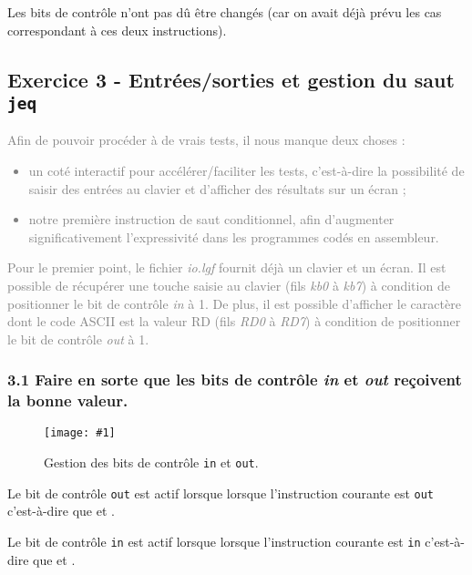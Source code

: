 \documentclass[twoside, 12pt, a4paper]{article}
\newcommand{\cf}[3]{
    \begin{figure}[!h]
        \centering
        \texttt{[image: \#1]}
    \caption{#3}\label{Fig:#1}
    \end{figure}
}
\newcommand{\hcf}[2]{\cf{#1}{.75}{#2}}
\newcommand{\fmnt}[2]{
\begin{figure}[!h]
    \centering
    \inputminted[]{asm}{#1}
    \caption{#2}
    \label{fig:#2}
\end{figure}
}
\begin{document}

Les bits de contrôle n'ont pas dû être changés (car on avait déjà prévu les cas correspondant à ces deux instructions).
        
        \clearpage

        \subsection{Exercice 3 - Entrées/sorties et gestion du saut \texttt{jeq}}

\textcolor{gray}{
Afin de pouvoir procéder à de vrais tests, il nous manque deux choses :
\begin{itemize}
    \item un coté interactif pour accélérer/faciliter les tests, c’est-à-dire la possibilité de saisir des
entrées au clavier et d’afficher des résultats sur un écran ;
    \item notre première instruction de saut conditionnel, afin d’augmenter significativement l’expressivité dans les programmes codés en assembleur.
\end{itemize}
Pour le premier point, le fichier \textit{io.lgf} fournit déjà un clavier et un écran. Il est possible de
récupérer une touche saisie au clavier (fils \textit{kb0} à \textit{kb7}) à condition de positionner le bit de contrôle
\textit{in} à 1. De plus, il est possible d’afficher le caractère dont le code ASCII est la valeur RD (fils
\textit{RD0} à \textit{RD7}) à condition de positionner le bit de contrôle \textit{out} à 1.
}

        \subsubsection*{\textbf{3.1} Faire en sorte que les bits de contrôle \textit{in} et \textit{out} reçoivent la bonne valeur.}

\hcf{in_out.png}{Gestion des bits de contrôle \texttt{in} et \texttt{out}.}

Le bit de contrôle \texttt{out} est actif lorsque lorsque l'instruction courante est \texttt{out} c'est-à-dire que
 et .

Le bit de contrôle \texttt{in} est actif lorsque lorsque l'instruction courante est \texttt{in} c'est-à-dire que
 et .
\end{document}
